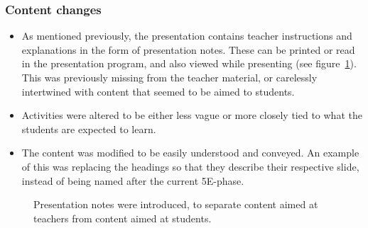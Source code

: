 \subsubsection*{Content changes}
\begin{itemize}
    \item As mentioned previously, the presentation contains teacher instructions and explanations in the form of presentation notes. These can be printed or read in the presentation program, and also viewed while presenting (see figure~\ref{notes}). This was previously missing from the teacher material, or carelessly intertwined with content that seemed to be aimed to students.
    \item Activities were altered to be either less vague or more closely tied to what the students are expected to learn.
    \item The content was modified to be easily understood and conveyed. An example of this was replacing the headings so that they describe their respective slide, instead of being named after the current 5E-phase.
\end{itemize}

\begin{figure}[H]
\centering
{}
\caption{Presentation notes were introduced, to separate content aimed at teachers from content aimed at students.}
\label{notes}
\end{figure}

